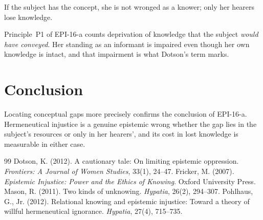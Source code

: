 \documentclass{situationist-preprint}
\begin{document}
\begin{objection}
If the subject has the concept, she is not wronged as a knower; only her hearers lose knowledge.
\end{objection}

\begin{reply}
Principle~P1 of EPI-16-a counts deprivation of knowledge that the subject \emph{would have conveyed}. Her standing as an informant is impaired even though her own knowledge is intact, and that impairment is what Dotson's term marks.
\end{reply}

\section{Conclusion}

Locating conceptual gaps more precisely confirms the conclusion of EPI-16-a. Hermeneutical injustice is a genuine epistemic wrong whether the gap lies in the subject's resources or only in her hearers', and its cost in lost knowledge is measurable in either case.

\begin{thebibliography}{99}\small
{} Dotson, K. (2012). A cautionary tale: On limiting epistemic oppression. \emph{Frontiers: A Journal of Women Studies}, 33(1), 24--47.
 Fricker, M. (2007). \emph{Epistemic Injustice: Power and the Ethics of Knowing}. Oxford University Press.
 Mason, R. (2011). Two kinds of unknowing. \emph{Hypatia}, 26(2), 294--307.
 Pohlhaus, G., Jr. (2012). Relational knowing and epistemic injustice: Toward a theory of willful hermeneutical ignorance. \emph{Hypatia}, 27(4), 715--735.
\end{thebibliography}
\end{document}
